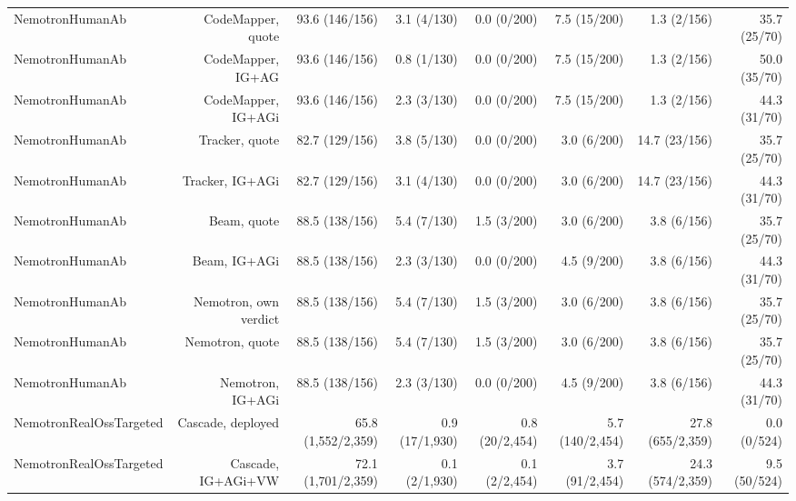 \begin{table}[t]
{\begin{tabular}{@{}lrrrrrrr@{}}
NemotronHumanAb & CodeMapper, quote & 93.6 (146/156) & 3.1 (4/130) & 0.0 (0/200) & 7.5 (15/200) & 1.3 (2/156) & 35.7 (25/70) \\
NemotronHumanAb & CodeMapper, IG+AG & 93.6 (146/156) & 0.8 (1/130) & 0.0 (0/200) & 7.5 (15/200) & 1.3 (2/156) & 50.0 (35/70) \\
NemotronHumanAb & CodeMapper, IG+AGi & 93.6 (146/156) & 2.3 (3/130) & 0.0 (0/200) & 7.5 (15/200) & 1.3 (2/156) & 44.3 (31/70) \\
NemotronHumanAb & Tracker, quote & 82.7 (129/156) & 3.8 (5/130) & 0.0 (0/200) & 3.0 (6/200) & 14.7 (23/156) & 35.7 (25/70) \\
NemotronHumanAb & Tracker, IG+AGi & 82.7 (129/156) & 3.1 (4/130) & 0.0 (0/200) & 3.0 (6/200) & 14.7 (23/156) & 44.3 (31/70) \\
NemotronHumanAb & Beam, quote & 88.5 (138/156) & 5.4 (7/130) & 1.5 (3/200) & 3.0 (6/200) & 3.8 (6/156) & 35.7 (25/70) \\
NemotronHumanAb & Beam, IG+AGi & 88.5 (138/156) & 2.3 (3/130) & 0.0 (0/200) & 4.5 (9/200) & 3.8 (6/156) & 44.3 (31/70) \\
NemotronHumanAb & Nemotron, own verdict & 88.5 (138/156) & 5.4 (7/130) & 1.5 (3/200) & 3.0 (6/200) & 3.8 (6/156) & 35.7 (25/70) \\
NemotronHumanAb & Nemotron, quote & 88.5 (138/156) & 5.4 (7/130) & 1.5 (3/200) & 3.0 (6/200) & 3.8 (6/156) & 35.7 (25/70) \\
NemotronHumanAb & Nemotron, IG+AGi & 88.5 (138/156) & 2.3 (3/130) & 0.0 (0/200) & 4.5 (9/200) & 3.8 (6/156) & 44.3 (31/70) \\
NemotronRealOssTargeted & Cascade, deployed & 65.8 (1,552/2,359) & 0.9 (17/1,930) & 0.8 (20/2,454) & 5.7 (140/2,454) & 27.8 (655/2,359) & 0.0 (0/524) \\
NemotronRealOssTargeted & Cascade, IG+AGi+VW & 72.1 (1,701/2,359) & 0.1 (2/1,930) & 0.1 (2/2,454) & 3.7 (91/2,454) & 24.3 (574/2,359) & 9.5 (50/524) \\
\bottomrule
\end{tabular}
}
\end{table}

